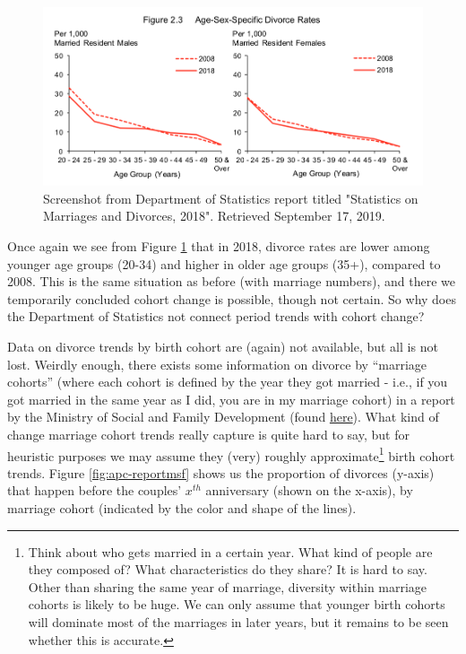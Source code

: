 \documentclass[openany]{book}
\let\rmarkdownfootnote\footnote%
\def\footnote{\protect\rmarkdownfootnote}
\begin{document}
\begin{figure}

{\centering \includegraphics[width=0.8\linewidth]{images/apc/report_fig3} 

}

\caption{Screenshot from Department of Statistics report titled "Statistics on Marriages and Divorces,  2018". Retrieved September 17, 2019.}\label{fig:apc-reportsingstat2nd}
\end{figure}

Once again we see from Figure \ref{fig:apc-reportsingstat2nd} that in
2018, divorce rates are lower among younger age groups (20-34) and
higher in older age groups (35+), compared to 2008. This is the same
situation as before (with marriage numbers), and there we temporarily
concluded cohort change is possible, though not certain. So why does the
Department of Statistics not connect period trends with cohort change?

Data on divorce trends by birth cohort are (again) not available, but
all is not lost. Weirdly enough, there exists some information on
divorce by ``marriage cohorts'' (where each cohort is defined by the
year they got married - i.e., if you got married in the same year as I
did, you are in my marriage cohort) in a report by the Ministry of
Social and Family Development (found
\href{https://www.msf.gov.sg/research-and-data/Research-and-Data-Series/Pages/default.aspx}{here}).
What kind of change marriage cohort trends really capture is quite hard
to say, but for heuristic purposes we may assume they (very) roughly
approximate\footnote{Think about who gets married in a certain year.
  What kind of people are they composed of? What characteristics do they
  share? It is hard to say. Other than sharing the same year of
  marriage, diversity within marriage cohorts is likely to be huge. We
  can only assume that younger birth cohorts will dominate most of the
  marriages in later years, but it remains to be seen whether this is
  accurate.} birth cohort trends. Figure \ref{fig:apc-reportmsf} shows
us the proportion of divorces (y-axis) that happen before the couples'
\(x^{th}\) anniversary (shown on the x-axis), by marriage cohort
(indicated by the color and shape of the lines).
\end{document}

